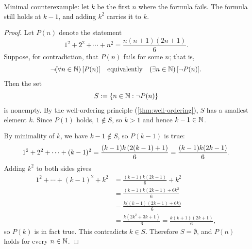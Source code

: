 \begin{idea}
    Minimal counterexample: let $k$ be the first $n$ where the formula fails. The formula still holds at $k-1$, and adding $k^2$ carries it to $k$.
\end{idea}
\begin{proof}
    Let $P(n)$ denote the statement
    \begin{equation*}
        1^2 + 2^2 + \cdots + n^2 = \frac{n(n + 1)(2n + 1)}{6}.
    \end{equation*}
    Suppose, for contradiction, that $P(n)$ fails for some $n$; that is,
    \begin{equation*}
        \neg(\forall n \in \mathbb{N})\,[P(n)]
        \quad\text{equivalently}\quad
        (\exists n \in \mathbb{N})\,[\neg P(n)].
    \end{equation*}
    Then the set
    \begin{equation*}
        S := \left\{n \in \mathbb{N} : \neg P(n)\right\}
    \end{equation*}
    is nonempty. By the well-ordering principle (\cref{thm:well-ordering}), $S$ has a smallest element $k$. Since $P(1)$ holds, $1\notin S$, so $k > 1$ and hence $k - 1\in\mathbb{N}$.

    By minimality of $k$, we have $k - 1\notin S$, so $P(k - 1)$ is true:
    \begin{equation*}
        1^2 + 2^2 + \cdots + (k - 1)^2
            = \frac{(k - 1)k\left(2(k - 1) + 1\right)}{6}
            = \frac{(k - 1)k(2k - 1)}{6}.
    \end{equation*}
    Adding $k^2$ to both sides gives
    \begin{align*}
        1^2 + \cdots + (k - 1)^2 + k^2
            &= \frac{(k - 1)k(2k - 1)}{6} + k^2 \\
            &= \frac{(k - 1)k(2k - 1) + 6k^2}{6} \\
            &= \frac{k\bigl((k-1)(2k-1)+6k\bigr)}{6} \\
            &= \frac{k(2k^2+3k+1)}{6}
             = \frac{k(k+1)(2k+1)}{6},
    \end{align*}
    so $P(k)$ is in fact true. This contradicts $k\in S$. Therefore $S=\emptyset$, and $P(n)$ holds for every $n\in\mathbb{N}$.
\end{proof}

